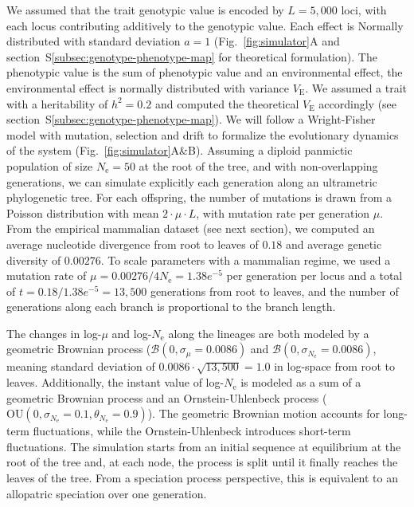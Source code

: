 \documentclass{article}
\newcommand{\Multiply}{\cdot}
\newcommand{\Ne}{N_{\text{e}}}
\newcommand{\Time}{t}
\newcommand{\Heritability}{h^2}
\newcommand{\MutationRate}{\mu}
\newcommand{\NbrLoci}{L}
\newcommand{\VarEnv}{V_{\mathrm{E}}}
\newcommand{\brownian}{\mathcal{B}}
\begin{document}
We assumed that the trait genotypic value is encoded by $\NbrLoci=5,000$ loci, with each locus contributing additively to the genotypic value.
Each effect is Normally distributed with standard deviation $a=1$ (Fig.~\ref{fig:simulator}A and section~S\ref{subsec:genotype-phenotype-map} for theoretical formulation).
The phenotypic value is the sum of phenotypic value and an environmental effect, the environmental effect is normally distributed with variance $\VarEnv$.
We assumed a trait with a heritability of $\Heritability =0.2$ and computed the theoretical $\VarEnv$ accordingly (see section~S\ref{subsec:genotype-phenotype-map}).
We will follow a Wright-Fisher model with mutation, selection and drift to formalize the evolutionary dynamics of the system (Fig.~\ref{fig:simulator}A\&B).
Assuming a diploid panmictic population of size $\Ne=50$ at the root of the tree, and with non-overlapping generations, we can simulate explicitly each generation along an ultrametric phylogenetic tree.
For each offspring, the number of mutations is drawn from a Poisson distribution with mean $2 \Multiply \MutationRate \Multiply \NbrLoci $, with mutation rate per generation $\MutationRate$.
From the empirical mammalian dataset (see next section), we computed an average nucleotide divergence from root to leaves of $0.18$ and average genetic diversity of $0.00276$.
To scale parameters with a mammalian regime, we used a mutation rate of $\MutationRate=0.00276 / 4 \Ne = 1.38e^{-5}$ per generation per locus and a total of $\Time = 0.18 / 1.38e^{-5} = 13,500$ generations from root to leaves, and the number of generations along each branch is proportional to the branch length.

The changes in log-$\MutationRate$ and log-$\Ne$ along the lineages are both modeled by a geometric Brownian process ($\brownian \left(0, \sigma_{\MutationRate}=0.0086\right)$ and $\brownian \left(0, \sigma_{\Ne}=0.0086\right)$, meaning standard deviation of $0.0086 \Multiply \sqrt {13,500} = 1.0$ in log-space from root to leaves.
Additionally, the instant value of log-$\Ne$ is modeled as a sum of a geometric Brownian process and an Ornstein-Uhlenbeck process ($\text{OU} \left(0, \sigma_{\Ne}=0.1, \theta_{\Ne}=0.9\right)$).
The geometric Brownian motion accounts for long-term fluctuations, while the Ornstein-Uhlenbeck introduces short-term fluctuations.
The simulation starts from an initial sequence at equilibrium at the root of the tree and, at each node, the process is split until it finally reaches the leaves of the tree.
From a speciation process perspective, this is equivalent to an allopatric speciation over one generation.
\end{document}

